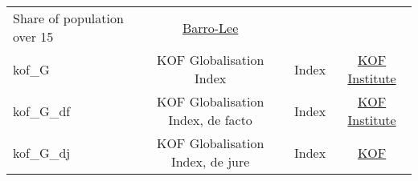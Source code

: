 \documentclass[]{article}
\begin{document}
\begin{longtable}[]{@{}lccc@{}}
\begin{minipage}[t]{0.24\columnwidth}
Share of population over 15\strut
\end{minipage} & \begin{minipage}[t]{0.15\columnwidth}\centering\strut
\href{http://www.barrolee.com/}{Barro-Lee}\strut
\end{minipage}\tabularnewline
\begin{minipage}[t]{0.14\columnwidth}\raggedright\strut
kof\_G\strut
\end{minipage} & \begin{minipage}[t]{0.36\columnwidth}\centering\strut
KOF Globalisation Index\strut
\end{minipage} & \begin{minipage}[t]{0.24\columnwidth}\centering\strut
Index\strut
\end{minipage} & \begin{minipage}[t]{0.15\columnwidth}\centering\strut
\href{https://www.kof.ethz.ch/en/forecasts-and-indicators/indicators/kof-globalisation-index.html}{KOF
Institute}\strut
\end{minipage}\tabularnewline
\begin{minipage}[t]{0.14\columnwidth}\raggedright\strut
kof\_G\_df\strut
\end{minipage} & \begin{minipage}[t]{0.36\columnwidth}\centering\strut
KOF Globalisation Index, de facto\strut
\end{minipage} & \begin{minipage}[t]{0.24\columnwidth}\centering\strut
Index\strut
\end{minipage} & \begin{minipage}[t]{0.15\columnwidth}\centering\strut
\href{https://www.kof.ethz.ch/en/forecasts-and-indicators/indicators/kof-globalisation-index.html}{KOF
Institute}\strut
\end{minipage}\tabularnewline
\begin{minipage}[t]{0.14\columnwidth}\raggedright\strut
kof\_G\_dj\strut
\end{minipage} & \begin{minipage}[t]{0.36\columnwidth}\centering\strut
KOF Globalisation Index, de jure\strut
\end{minipage} & \begin{minipage}[t]{0.24\columnwidth}\centering\strut
Index\strut
\end{minipage} & \begin{minipage}[t]{0.15\columnwidth}\centering\strut
\href{https://www.kof.ethz.ch/en/forecasts-and-indicators/indicators/kof-globalisation-index.html}{KOF
}
\end{minipage}
\end{longtable}
\end{document}
